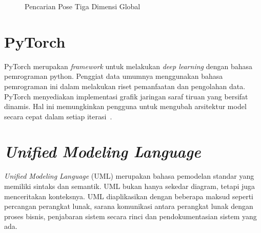 \begin{figure}[htbp]
    \begin{center}
    \end{center}
    \vspace{-20pt}
    \captionsetup{labelfont=bf, textfont=bf}
    \caption{Pencarian Pose Tiga Dimensi Global}
    \vspace{-10pt}
    \captionsetup{labelfont=md, textfont=md}
    \label{fig:global}
\end{figure}

\section{PyTorch}
\label{sec:2-PyTorch}

PyTorch merupakan \textit{framework} untuk melakukan \textit{deep learning} dengan bahasa pemrograman
python. Penggiat data umumnya menggunakan bahasa pemrograman ini dalam melakukan
riset pemanfaatan dan pengolahan data. PyTorch menyediakan implementasi grafik jaringan saraf tiruan yang bersifat dinamis.
Hal ini memungkinkan pengguna untuk mengubah arsitektur model secara cepat dalam setiap iterasi~\cite{2019arXiv191201703P}.


\section{\textit{Unified Modeling Language}}
\label{sec:2-uml}

\textit{Unified Modeling Language} (UML) merupakan bahasa pemodelan standar yang memiliki sintaks
dan semantik. UML bukan hanya sekedar diagram, tetapi juga menceritakan konteksnya. UML
diaplikasikan dengan beberapa maksud seperti percangan perangkat lunak, sarana komunikasi antara
perangkat lunak dengan proses bisnis, penjabaran sistem secara rinci dan pendokumentasian sistem
yang ada.

